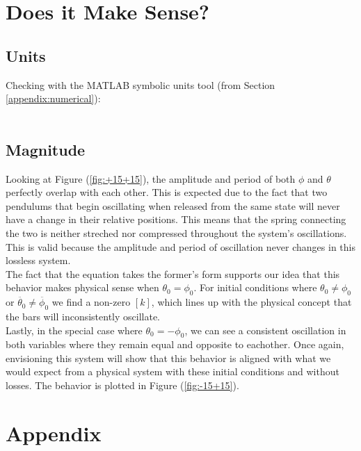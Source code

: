 \documentclass[12pt]{report}
\begin{document}
\begin{flushleft}
\null\vfill
\newpage
\vfill\null
\newpage
\section{Does it Make Sense?}
\subsection{Units}


Checking with the MATLAB symbolic units tool (from Section \ref{appendix:numerical}): \\
~\\

\newpage
\subsection{Magnitude}
Looking at Figure (\ref{fig:+15+15}), the amplitude and period of both $\phi$ and $\theta$ perfectly overlap with each other. This is expected due to the fact that two pendulums that begin oscillating when released from the same state will never have a change in their relative positions. This means that the spring connecting the two is neither streched nor compressed throughout the system's oscillations. This is valid because the amplitude and period of oscillation never changes in this lossless system. \\

The fact that the equation takes the former's form supports our idea that this behavior makes physical sense when $\theta_0 = \phi_0$. For initial conditions where $\theta_0 \neq \phi_0$ or $\ddot{\theta_0} \neq \ddot{\phi_0}$ we find a non-zero $[k]$, which lines up with the physical concept that the bars will inconsistently oscillate. \\
Lastly, in the special case where $\theta_0 = -\phi_0$, we can see a consistent oscillation in both variables where they remain equal and opposite to eachother. Once again, envisioning this system will show that this behavior is aligned with what we would expect from a physical system with these initial conditions and without losses. The behavior is plotted in Figure (\ref{fig:-15+15}).

\section{Appendix} \label{appendix}

\end{flushleft}
\end{document}
